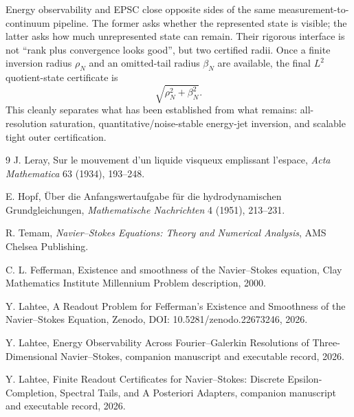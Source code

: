 \documentclass[11pt]{article}
\theoremstyle{definition}
\begin{document}
Energy observability and EPSC close opposite sides of the same measurement-to-continuum pipeline.
The former asks whether the represented state is visible; the latter asks how much unrepresented
state can remain.  Their rigorous interface is not ``rank plus convergence looks good'', but two
certified radii.  Once a finite inversion radius $\rho_N$ and an omitted-tail radius $\beta_N$ are
available, the final $L^2$ quotient-state certificate is
\[
\sqrt{\rho_N^2+\beta_N^2}.
\]
This cleanly separates what has been established from what remains: all-resolution saturation,
quantitative/noise-stable energy-jet inversion, and scalable tight outer certification.

\begin{thebibliography}{9}
J. Leray,
\newblock Sur le mouvement d'un liquide visqueux emplissant l'espace,
\newblock \emph{Acta Mathematica} 63 (1934), 193--248.

E. Hopf,
\newblock \"Uber die Anfangswertaufgabe f\"ur die hydrodynamischen Grundgleichungen,
\newblock \emph{Mathematische Nachrichten} 4 (1951), 213--231.

R. Temam,
\newblock \emph{Navier--Stokes Equations: Theory and Numerical Analysis},
\newblock AMS Chelsea Publishing.

C. L. Fefferman,
\newblock Existence and smoothness of the Navier--Stokes equation,
\newblock Clay Mathematics Institute Millennium Problem description, 2000.

Y. Lahtee,
\newblock A Readout Problem for Fefferman's Existence and Smoothness of the Navier--Stokes Equation,
\newblock Zenodo, DOI: 10.5281/zenodo.22673246, 2026.

Y. Lahtee,
\newblock Energy Observability Across Fourier--Galerkin Resolutions of Three-Dimensional Navier--Stokes,
\newblock companion manuscript and executable record, 2026.

Y. Lahtee,
\newblock Finite Readout Certificates for Navier--Stokes: Discrete Epsilon-Completion, Spectral Tails,
\newblock and A Posteriori Adapters, companion manuscript and executable record, 2026.
\end{thebibliography}
\end{document}
